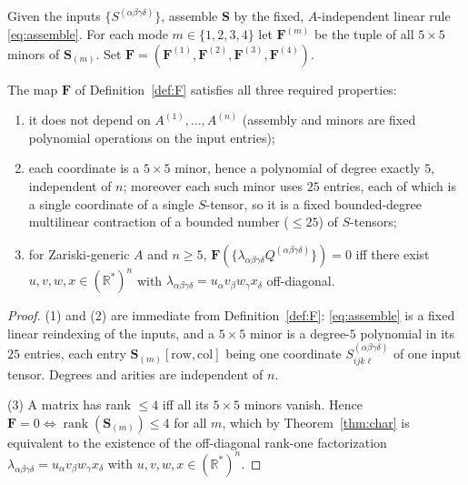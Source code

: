 \begin{definition}\label{def:F}
Given the inputs $\{S^{(\alpha\beta\gamma\delta)}\}$, assemble $\mathbf S$ by the fixed,
$A$-independent linear rule \eqref{eq:assemble}. For each mode $m\in\{1,2,3,4\}$ let
$\mathbf F^{(m)}$ be the tuple of all $5\times5$ minors of $\mathbf S_{(m)}$. Set
$\mathbf F=(\mathbf F^{(1)},\mathbf F^{(2)},\mathbf F^{(3)},\mathbf F^{(4)})$.
\end{definition}

\begin{theorem}\label{thm:main}
The map $\mathbf F$ of Definition~\ref{def:F} satisfies all three required properties:
\begin{enumerate}
\item it does not depend on $A^{(1)},\dots,A^{(n)}$ (assembly and minors are fixed
polynomial operations on the input entries);
\item each coordinate is a $5\times5$ minor, hence a polynomial of degree exactly $5$,
independent of $n$; moreover each such minor uses $25$ entries, each of which is a single
coordinate of a single $S$-tensor, so it is a fixed bounded-degree multilinear
contraction of a bounded number ($\le25$) of $S$-tensors;
\item for Zariski-generic $A$ and $n\ge5$,
$\mathbf F(\{\lambda_{\alpha\beta\gamma\delta}Q^{(\alpha\beta\gamma\delta)}\})=0$ iff
there exist $u,v,w,x\in(\mathbb R^*)^n$ with
$\lambda_{\alpha\beta\gamma\delta}=u_\alpha v_\beta w_\gamma x_\delta$ off-diagonal.
\end{enumerate}
\end{theorem}

\begin{proof}
(1) and (2) are immediate from Definition~\ref{def:F}: \eqref{eq:assemble} is a fixed
linear reindexing of the inputs, and a $5\times5$ minor is a degree-$5$ polynomial in
its $25$ entries, each entry $\mathbf S_{(m)}[\text{row},\text{col}]$ being one
coordinate $S^{(\alpha\beta\gamma\delta)}_{ijk\ell}$ of one input tensor. Degrees and
arities are independent of $n$.

(3) A matrix has rank $\le4$ iff all its $5\times5$ minors vanish. Hence $\mathbf F=0
\iff\operatorname{rank}(\mathbf S_{(m)})\le4$ for all $m$, which by
Theorem~\ref{thm:char} is equivalent to the existence of the off-diagonal rank-one
factorization $\lambda_{\alpha\beta\gamma\delta}=u_\alpha v_\beta w_\gamma x_\delta$ with
$u,v,w,x\in(\mathbb R^*)^n$.
\end{proof}

